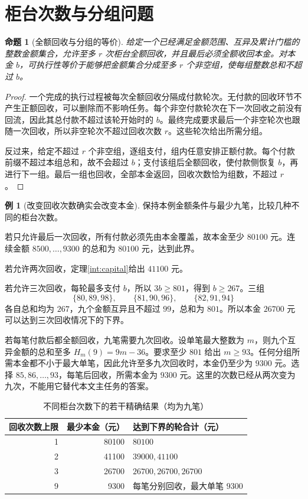 \documentclass[UTF8,a4paper]{ctexbook}
\newtheorem{proposition}[theorem]{命题}
\theoremstyle{definition}
\newtheorem{example}[theorem]{例}
\numberwithin{equation}{chapter}
\newcommand{\1}{\mathbf{1}}
\begin{document}
\section{柜台次数与分组问题}
\begin{proposition}[全额回收与分组的等价]\label{gen:partition}
给定一个已经满足金额范围、互异及累计门槛的整数金额集合，允许至多 $r$ 次柜台全额回收，并且最后必须全额收回本金。对本金 $b$，可执行性等价于能够把金额集合分成至多 $r$ 个非空组，使每组整数总和不超过 $b$。
\end{proposition}
\begin{proof}
一个完成的执行过程被每次全额回收分隔成付款轮次。无付款的回收环节不产生正额回收，可以删除而不影响任务。每个非空付款轮次在下一次回收之前没有回流，因此其总付款不超过该轮开始时的 $b$。最终完成要求最后一个非空轮次也跟随一次回收，所以非空轮次不超过回收次数 $r$。这些轮次给出所需分组。

反过来，给定不超过 $r$ 个非空组，逐组支付，组内任意安排正额付款。每个付款前缀不超过本组总和，故不会超过 $b$；支付该组后全额回收，使付款侧恢复 $b$，再进行下一组。最后一组也回收，全部本金返回，回收次数恰为组数，不超过 $r$。
\end{proof}

\begin{example}[改变回收次数确实会改变本金]
保持本例金额条件与最少九笔，比较几种不同的柜台次数。

若只允许最后一次回收，所有付款必须先由本金覆盖，故本金至少 $80100$ 元。连续金额 $8500,\ldots,9300$ 的总和为 $80100$ 元，达到此界。

若允许两次回收，定理\ref{int:capital}给出 $41100$ 元。

若允许三次回收，每轮最多支付 $b$，所以 $3b\ge801$，得到 $b\ge267$。三组
\[
\{80,89,98\},\qquad\{81,90,96\},\qquad\{82,91,94\}
\]
各自总和均为 $267$，九个金额互异且不超过 $99$，总和为 $801$。所以本金 $26700$ 元可以达到三次回收情况下的下界。

若每笔付款后都全额回收，九笔需要九次回收。设单笔最大整数为 $m$，则九个互异金额的总和至多 $H_m(9)=9m-36$。要求至少 $801$ 给出 $m\ge93$。任何分组所需本金都不小于最大单笔，因此允许至多九次回收时，本金仍至少为 $9300$ 元。选择 $85,86,\ldots,93$，每笔后回收，所需本金为 $9300$ 元。这里的次数已经从两次变为九次，不能用它替代本文主任务的答案。
\end{example}

\begin{table}[htbp]
\centering
\caption{不同柜台次数下的若干精确结果（均为九笔）}
\begin{tabular}{@{}rrl@{}}
\toprule
回收次数上限 & 最少本金（元） & 达到下界的轮合计（元）\\
\midrule
1 & 80100 & $80100$\\
2 & 41100 & $39000,41100$\\
3 & 26700 & $26700,26700,26700$\\
9 & 9300 & 每笔分别回收，最大单笔 $9300$\\
\bottomrule
\end{tabular}
\end{table}
\end{document}
